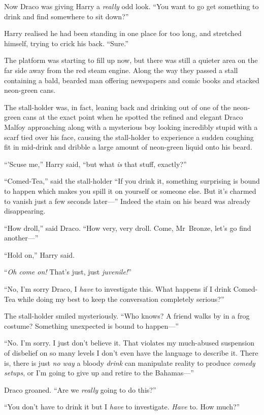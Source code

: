 Now Draco was giving Harry a \emph{really} odd look. “You want to go get something to drink and find somewhere to sit down?”

Harry realised he had been standing in one place for too long, and stretched himself, trying to crick his back. “Sure.”

The platform was starting to fill up now, but there was still a quieter area on the far side away from the red steam engine. Along the way they passed a stall containing a bald, bearded man offering newspapers and comic books and stacked neon-green cans.

The stall-holder was, in fact, leaning back and drinking out of one of the neon-green cans at the exact point when he spotted the refined and elegant Draco Malfoy approaching along with a mysterious boy looking incredibly stupid with a scarf tied over his face, causing the stall-holder to experience a sudden coughing fit in mid-drink and dribble a large amount of neon-green liquid onto his beard.

“’Scuse me,” Harry said, “but what \emph{is} that stuff, exactly?”

“Comed-Tea,” said the stall-holder “If you drink it, something surprising is bound to happen which makes you spill it on yourself or someone else. But it’s charmed to vanish just a few seconds later—” Indeed the stain on his beard was already disappearing.

“How droll,” said Draco. “How very, very droll. Come, Mr~Bronze, let’s go find another—”

“Hold on,” Harry said.

“\emph{Oh come on!} That’s just, just \emph{juvenile!}”

“No, I’m sorry Draco, I \emph{have} to investigate this. What happens if I drink Comed-Tea while doing my best to keep the conversation completely serious?”

The stall-holder smiled mysteriously. “Who knows? A friend walks by in a frog costume? Something unexpected is bound to happen—”

“No. I’m sorry. I just don’t believe it. That violates my much-abused suspension of disbelief on so many levels I don’t even have the language to describe it. There is, there is just \emph{no way} a bloody \emph{drink} can manipulate reality to produce \emph{comedy setups}, or I’m going to give up and retire to the Bahamas—”

Draco groaned. “Are we \emph{really} going to do this?”

“You don’t have to drink it but I \emph{have} to investigate. \emph{Have} to. How much?”

